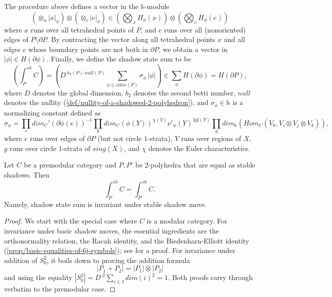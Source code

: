 \begin{definition}
\noindent The procedure above defines a vector in the
$\mathbb{k}$-module
$$(\otimes_{x} |x|_{\phi}) \otimes (\otimes_{e} |e|_{\phi}) \in \left( \bigotimes_{x} H_{\phi}(x) \right) \otimes \left( \bigotimes_{e} H_{\phi}(e) \right)$$
where $x$ runs over all tetrahedral points of $P$, and $e$ runs
over all (nonoriented) edges of $P \setminus \partial P$. By
contracting the vector along all tetrahedral points $x$ and all
edges $e$ whose boundary points are not both in $\partial P$, we
obtain a vector in $|\phi| \in H(\partial \phi)$. Finally, we
define the shadow state sum to be
$$\left(\int^{sh}_{P} C \right) = \left( D^{\text{-} b_{2}(P) \text{-} null(P)} \sum_{\phi \in color(P)} \sigma_{\phi} \, |\phi| \right) \in \sum_{\phi} H(\partial \phi) = H(\partial P),$$
where $D$ denotes the global dimension, $b_{2}$ denotes the
second betti number, $null$ denotes the nullity
(\ref{def/nullity-of-a-shadowed-2-polyhedron}), and
$\sigma_{\phi} \in \mathbb{k}$ is a normalizing constant defined
as
$$\sigma_{\phi} = \prod_{e} dim_{C}'(\partial\phi(e))^{-1} \prod_{Y} dim_{C}(\phi(Y))^{\chi(Y)} \nu'_{\phi}(Y)^{2gl(Y)} \prod_{g} dim_{\mathbb{k}}(Hom_{C}(V_{0}, V_{i} \otimes V_{j} \otimes V_{k})),$$
where $e$ runs over edges of $\partial P$ (but not circle
$1$-strata), $Y$ runs over regions of $X$, $g$ runs over circle
$1$-strata of $sing(X)$, and $\chi$ denotes the Euler
characteristics.
\end{definition}

\begin{proposition}\label{prop/shadow-state-sum-is-invariant-under-stable-shadow-move}
  Let $C$ be a premodular category and $P, P'$ be $2$-polyhedra
  that are equal as stable shadows. Then
  $$\int^{sh}_{P} C = \int^{sh}_{P'} C.$$
  Namely, shadow state sum is invariant under stable shadow move.
\end{proposition}
\begin{proof}
  We start with the special case where $C$ is a modular category.
  For invariance under basic shadow moves, the essential
  ingredients are the orthonormality relation, the Racah
  identity, and the Biedenharn-Elliott identity
  (\ref{prop/basic-equalities-of-6j-symbols}); see \cite[theorem
  X.2.1]{turaev-qiok-3-manifolds} for a proof. For invariance
  under addition of $S^{2}_{0}$, it boils down to proving the
  addition formula $$|P_{1} + P_{2}| = |P_{1}| \otimes |P_{2}|$$
  \cite[theorem X.2.2]{turaev-qiok-3-manifolds} and using the
  equality $|S^{2}_{0}| = D^{\text{-}2} \sum_{i \in I} dim(i)^{2} = 1$.
  Both proofs carry through verbatim to the premodular case.
\end{proof}


